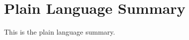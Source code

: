\documentclass[draft]{agujournal2019}
\begin{document}
\section*{Plain Language Summary}
This is the plain language summary.

%
%

%


%
%
%
%
\end{document}
